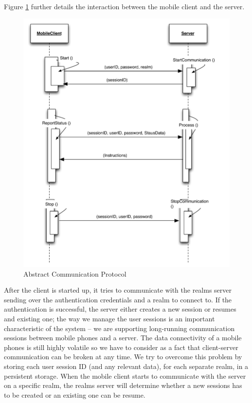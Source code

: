 Figure \ref{fig.design.comm_protocol} further details the interaction between the mobile client and the server.
\\
\begin{figure}[H]
	\centering
	\includegraphics[width=1.0\linewidth]{fig/abstract_communication_protocol}
	\caption{Abstract Communication Protocol}
	\label{fig.design.comm_protocol}
\end{figure}
After the client is started up, it tries to communicate with the realms server sending over the authentication credentials and a realm to connect to. If the authentication is successful, the server either creates a new session or resumes and existing one; the way we manage the user sessions is an important characteristic of the system -- we are supporting long-running communication sessions between mobile phones and a server. The data connectivity of a mobile phones is still highly volatile so we have to consider as a fact that client-server communication can be broken at any time. We try to overcome this problem by storing each user session ID (and any relevant data), for each separate realm, in a persistent storage. When the mobile client starts to communicate with the server on a specific realm, the realms server will determine whether a new sessions has to be created or an existing one can be resume.
\\

